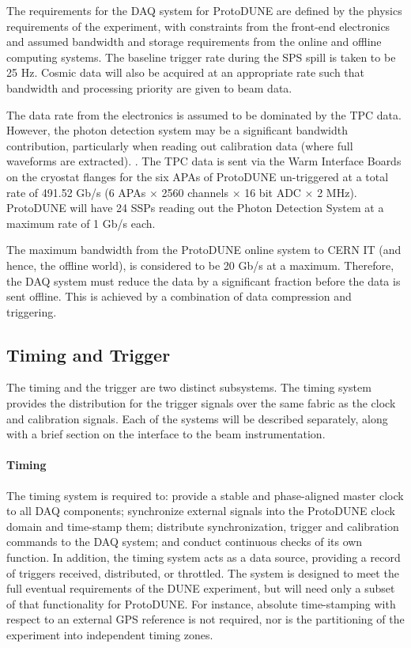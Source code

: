 The requirements for the DAQ system for ProtoDUNE are defined
by the physics requirements of the experiment, with constraints from the
front-end electronics and assumed bandwidth and storage requirements
from the online and offline computing systems.  The baseline trigger
rate during the SPS spill is taken to be 25 Hz.  Cosmic data will also
be acquired at an appropriate rate such that bandwidth and processing priority are given 
to beam data.

The data rate from the electronics is assumed to be dominated by the
TPC data.  However, the photon detection system may be a significant
bandwidth contribution, particularly when reading out calibration data
(where full waveforms are extracted).  .
The TPC data is sent via the Warm Interface Boards on the cryostat flanges
for the six APAs of ProtoDUNE un-triggered at a total rate of 491.52 Gb/s
(6 APAs $\times$ 2560 channels $\times$ 16 bit ADC $\times$ 2 MHz).
ProtoDUNE will have 24 SSPs reading out the Photon Detection System at
a maximum rate of 1 Gb/s each.

The maximum bandwidth from the ProtoDUNE online system to CERN IT (and
hence, the offline world), is considered to be 20 Gb/s at a maximum.
Therefore, the DAQ system must reduce the data by a significant fraction
before the data is sent offline.  This is achieved by a combination of
data compression and triggering.


\subsection{Timing and Trigger}
\label{sec:daq_time}

The timing and the trigger are two distinct subsystems.  The timing
system provides the distribution for the trigger signals over the same
fabric as the clock and calibration signals.  Each of the systems will
be described separately, along with a brief section on the interface to
the beam instrumentation.

\paragraph{Timing}


The timing system is required to: provide a stable and phase-aligned
master clock to all DAQ components; synchronize external signals into the
ProtoDUNE clock domain and time-stamp them; distribute synchronization,
trigger and calibration commands to the DAQ system; and conduct continuous
checks of its own function. In addition, the timing system acts as a
data source, providing a record of triggers received, distributed, or
throttled. The system is designed to meet the full eventual requirements
of the DUNE experiment, but will need only a subset of that functionality
for ProtoDUNE. For instance, absolute time-stamping with respect to an
external GPS reference is not required, nor is the partitioning of the
experiment into independent timing zones.

